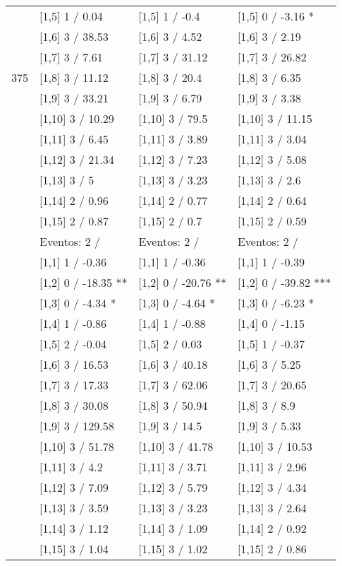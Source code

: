 \begin{table}
\begin{tabular}[t]{llll}
 & {}[1,5] 1  / 0.04 & {}[1,5] 1  / -0.4 & {}[1,5] 0  / -3.16 *\\
 & {}[1,6] 3  / 38.53 & {}[1,6] 3  / 4.52 & {}[1,6] 3  / 2.19\\
 & {}[1,7] 3  / 7.61 & {}[1,7] 3  / 31.12 & {}[1,7] 3  / 26.82\\
375 & {}[1,8] 3  / 11.12 & {}[1,8] 3  / 20.4 & {}[1,8] 3  / 6.35\\
\addlinespace
 & {}[1,9] 3  / 33.21 & {}[1,9] 3  / 6.79 & {}[1,9] 3  / 3.38\\
 & {}[1,10] 3  / 10.29 & {}[1,10] 3  / 79.5 & {}[1,10] 3  / 11.15\\
 & {}[1,11] 3  / 6.45 & {}[1,11] 3  / 3.89 & {}[1,11] 3  / 3.04\\
 & {}[1,12] 3  / 21.34 & {}[1,12] 3  / 7.23 & {}[1,12] 3  / 5.08\\
 & {}[1,13] 3  / 5 & {}[1,13] 3  / 3.23 & {}[1,13] 3  / 2.6\\
\addlinespace
 & {}[1,14] 2  / 0.96 & {}[1,14] 2  / 0.77 & {}[1,14] 2  / 0.64\\
 & {}[1,15] 2  / 0.87 & {}[1,15] 2  / 0.7 & {}[1,15] 2  / 0.59\\
 & Eventos:  2 / & Eventos:  2 / & Eventos:  2 /\\
 & {}[1,1] 1  / -0.36 & {}[1,1] 1  / -0.36 & {}[1,1] 1  / -0.39\\
 & {}[1,2] 0  / -18.35 ** & {}[1,2] 0  / -20.76 ** & {}[1,2] 0  / -39.82 ***\\
\addlinespace
 & {}[1,3] 0  / -4.34 * & {}[1,3] 0  / -4.64 * & {}[1,3] 0  / -6.23 *\\
 & {}[1,4] 1  / -0.86 & {}[1,4] 1  / -0.88 & {}[1,4] 0  / -1.15\\
 & {}[1,5] 2  / -0.04 & {}[1,5] 2  / 0.03 & {}[1,5] 1  / -0.37\\
 & {}[1,6] 3  / 16.53 & {}[1,6] 3  / 40.18 & {}[1,6] 3  / 5.25\\
 & {}[1,7] 3  / 17.33 & {}[1,7] 3  / 62.06 & {}[1,7] 3  / 20.65\\
\addlinespace
500 & {}[1,8] 3  / 30.08 & {}[1,8] 3  / 50.94 & {}[1,8] 3  / 8.9\\
 & {}[1,9] 3  / 129.58 & {}[1,9] 3  / 14.5 & {}[1,9] 3  / 5.33\\
 & {}[1,10] 3  / 51.78 & {}[1,10] 3  / 41.78 & {}[1,10] 3  / 10.53\\
 & {}[1,11] 3  / 4.2 & {}[1,11] 3  / 3.71 & {}[1,11] 3  / 2.96\\
 & {}[1,12] 3  / 7.09 & {}[1,12] 3  / 5.79 & {}[1,12] 3  / 4.34\\
\addlinespace
 & {}[1,13] 3  / 3.59 & {}[1,13] 3  / 3.23 & {}[1,13] 3  / 2.64\\
 & {}[1,14] 3  / 1.12 & {}[1,14] 3  / 1.09 & {}[1,14] 2  / 0.92\\
 & {}[1,15] 3  / 1.04 & {}[1,15] 3  / 1.02 & {}[1,15] 2  / 0.86\\
\bottomrule
\end{tabular}
\end{table}
